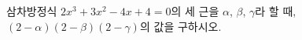 삼차방정식 $2x^3+3x^2-4x+4=0$의 세 근을 $\alpha$, $\beta$, $\gamma$라 할 때, $(2-\alpha)(2-\beta)(2-\gamma)$의 값을 구하시오.
